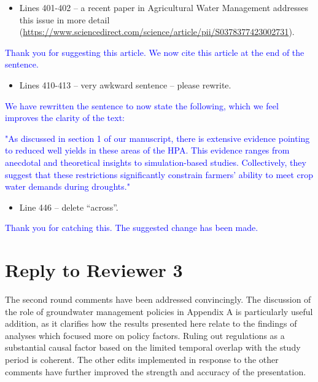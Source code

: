 \documentclass[
]{article}
\providecommand{\tightlist}{%
  \setlength{\itemsep}{0pt}\setlength{\parskip}{0pt}}
\begin{document}
\begin{itemize}
\tightlist
\item
  Lines 401-402 -- a recent paper in Agricultural Water Management
  addresses this issue in more detail
  (\url{https://www.sciencedirect.com/science/article/pii/S0378377423002731}).
\end{itemize}

\textcolor{blue}{Thank you for suggesting this article. We now cite this article at the end of the sentence.}

\begin{itemize}
\tightlist
\item
  Lines 410-413 -- very awkward sentence -- please rewrite.
\end{itemize}

\textcolor{blue}{We have rewritten the sentence to now state the following, which we feel improves the clarity of the text:}

\textcolor{blue}{"As discussed in section 1 of our manuscript, there is extensive evidence pointing to reduced well yields in these areas of the HPA. This evidence ranges from anecdotal and theoretical insights to simulation-based studies. Collectively, they suggest that these restrictions significantly constrain farmers' ability to meet crop water demands during droughts."}

\begin{itemize}
\tightlist
\item
  Line 446 -- delete ``across''.
\end{itemize}

\textcolor{blue}{Thank you for catching this. The suggested change has been made.}

\hypertarget{reply-to-reviewer-3}{%
\section{Reply to Reviewer 3}\label{reply-to-reviewer-3}}

The second round comments have been addressed convincingly. The
discussion of the role of groundwater management policies in Appendix A
is particularly useful addition, as it clarifies how the results
presented here relate to the findings of analyses which focused more on
policy factors. Ruling out regulations as a substantial causal factor
based on the limited temporal overlap with the study period is coherent.
The other edits implemented in response to the other comments have
further improved the strength and accuracy of the presentation.
\end{document}
